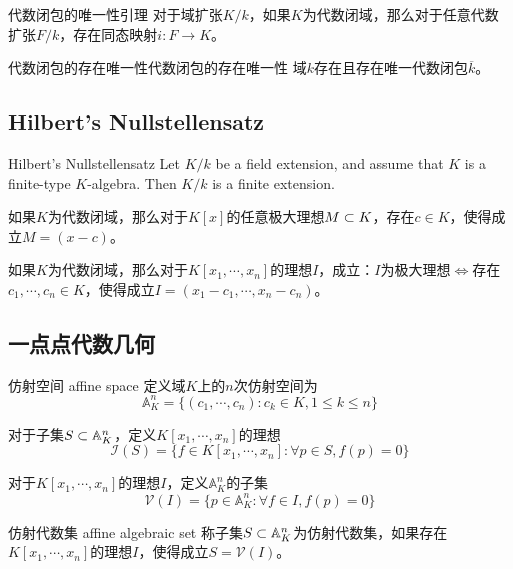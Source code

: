\begin{lemma}{}{代数闭包的唯一性引理}
	对于域扩张$K/k$，如果$K$为代数闭域，那么对于任意代数扩张$F/k$，存在同态映射$i:F\to K$。
\end{lemma}

\begin{theorem}{代数闭包的存在唯一性}{代数闭包的存在唯一性}
	域$k$存在且存在唯一代数闭包$\overline{k}$。
\end{theorem}

\subsection{Hilbert's Nullstellensatz}

\begin{theorem}{Hilbert's Nullstellensatz}
	Let $K/k$ be a field extension, and assume that $K$ is a finite-type $K$-algebra. Then $K/k$ is a finite extension.
\end{theorem}

\begin{corollary}
	如果$K$为代数闭域，那么对于$K[x]$的任意极大理想$M\subset K$，存在$c\in K$，使得成立$M=(x-c)$。
\end{corollary}

\begin{corollary}
	如果$K$为代数闭域，那么对于$K[x_1,\cdots,x_n]$的理想$I$，成立：$I$为极大理想$\iff$存在$c_1,\cdots,c_n\in K$，使得成立$I=(x_1-c_1,\cdots,x_n-c_n)$。
\end{corollary}

\subsection{一点点代数几何}

\begin{definition}{仿射空间 affine space}
	定义域$K$上的$n$次仿射空间为%
	$$
	\mathbb{A}_K^n=\{ (c_1,\cdots,c_n):c_k\in K,1\le k \le n \}
	$$
\end{definition}

\begin{definition}
	对于子集$S\subset \mathbb{A}_K^n$，定义$K[x_1,\cdots,x_n]$的理想
	$$
	\mathscr{I}(S)=\{ f\in K[x_1,\cdots,x_n]:\forall p\in S,f(p)=0 \}
	$$
	
	对于$K[x_1,\cdots,x_n]$的理想$I$，定义$\mathbb{A}_K^n$的子集%
	$$
	\mathscr{V}(I)=\{ p\in \mathbb{A}_K^n:\forall f\in I,f(p)=0 \}
	$$
\end{definition}

\begin{definition}{仿射代数集 affine algebraic set}
	称子集$S\subset \mathbb{A}_K^n$为仿射代数集，如果存在$K[x_1,\cdots,x_n]$的理想$I$，使得成立$S=\mathscr{V}(I)$。
\end{definition}

